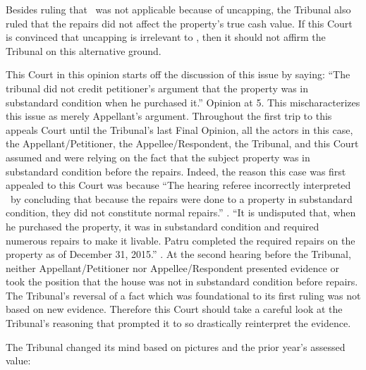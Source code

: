 \documentclass[12pt,\documentclassflag]{michiganCourtOfAppealsBrief}
\begin{document}
Besides ruling that \mathieuGast\ was not applicable because of uncapping, the Tribunal also ruled that the repairs did not affect the property's true cash value. If this Court is convinced that uncapping is irrelevant to \mathieuGast, then it should not affirm the Tribunal on this alternative ground.

This Court in this opinion starts off the discussion of this issue by saying: ``The
tribunal did not credit petitioner's argument that the property was in substandard condition when
he purchased it.'' Opinion at 5. This mischaracterizes this issue as merely Appellant's argument. Throughout the first trip to this appeals Court until the Tribunal's last Final Opinion, all the actors in this case, the Appellant/Petitioner, the Appellee/Respondent, the Tribunal, and this Court assumed and were relying on the fact that the subject property was in substandard condition before the repairs. Indeed, the reason this case was first appealed to this Court was because ``The hearing referee incorrectly interpreted \mathieuGast\ by concluding that because the repairs were done to a property in substandard condition, they did not constitute normal repairs.'' . 
``It is undisputed that, when he purchased the property, it was in substandard condition and required numerous repairs to make it livable. Patru completed the required repairs on the property as of December 31, 2015.'' . At the second hearing before the Tribunal, neither Appellant/Petitioner nor Appellee/Respondent presented evidence or took the position that the house was not in substandard condition before repairs. The Tribunal's reversal of a fact which was foundational to its first ruling was not based on new evidence. Therefore this Court should take a careful look at the Tribunal's reasoning that prompted it to so drastically reinterpret the evidence.

The Tribunal changed its mind based on pictures and the prior year's assessed value:
\end{document}
